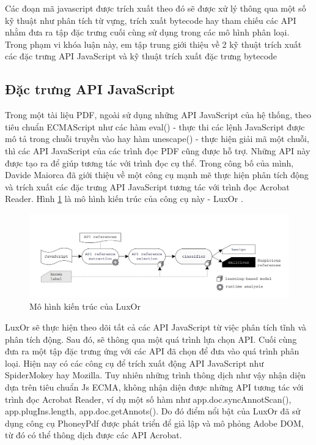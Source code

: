 \documentclass[./../main.tex]{subfiles}
\begin{document}
Các đoạn mã javascript được trích xuất theo đó sẽ được xử lý thông qua một số kỹ thuật như phân tích từ vựng, trích xuất bytecode hay tham chiếu các API nhằm đưa ra tập đặc trưng cuối cùng sử dụng trong các mô hình phân loại. Trong phạm vi khóa luận này, em tập trung giới thiệu về 2 kỹ thuật trích xuất các đặc trưng API JavaScript và kỹ thuật trích xuất đặc trưng bytecode

\subsection{Đặc trưng API JavaScript}

Trong một tài liệu PDF, ngoài sử dụng những API JavaScript của hệ thống, theo tiêu chuẩn ECMAScript như các hàm eval() - thực thi các lệnh JavaScript được mô tả trong chuỗi truyền vào hay hàm unescape() - thực hiện giải mã một chuỗi, thì các API JavaScript của các trình đọc PDF cũng được hỗ trợ. Những API này được tạo ra để giúp tương tác với trình đọc cụ thể. Trong công bố của mình, Davide Maiorca đã giới thiệu về một công cụ mạnh mẽ thực hiện phân tích động và trích xuất các đặc trưng API JavaScript tương tác với trình đọc Acrobat Reader. Hình \ref{fig:luxor} là mô hình kiến trúc của công cụ này - LuxOr \cite{luxor}.

\begin{figure}[H]
	\centering
	\includegraphics[width=\linewidth]{./images/luxOr.png}
	\caption{Mô hình kiến trúc của LuxOr \cite{luxor}}
	\label{fig:luxor}
\end{figure}

LuxOr sẽ thực hiện theo dõi tất cả các API JavaScript từ việc phân tích tĩnh và phân tích động. Sau đó, sẽ thông qua một quá trình lựa chọn API. Cuối cùng đưa ra một tập đặc trưng ứng với các API đã chọn để đưa vào quá trình phân loại. Hiện nay có các công cụ để trích xuất động API JavaScript như SpiderMokey hay Mozilla. Tuy nhiên những trình thông dịch như vậy nhận diện dựa trên tiêu chuẩn Js ECMA, không nhận diện được những API tương tác với trình đọc Acrobat Reader, ví dụ một số hàm như app.doc.syncAnnotScan(), app.plugIns.length, app.doc.getAnnots(). Do đó điểm nổi bật của LuxOr đã sử dụng công cụ PhoneyPdf được phát triển để giả lập và mô phỏng Adobe DOM, từ đó có thể thông dịch được các API Acrobat.
\end{document}
